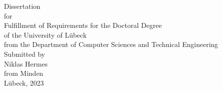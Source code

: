 \begin{center}
\begin{Large}
\end{Large}
\vspace*{2.5cm}
%
%
Dissertation\\ 
for\\
Fulfillment of Requirements for the Doctoral Degree\\
of the University of Lübeck\\[1.0cm]
%
from the Department of Computer Sciences and Technical Engineering\\[1.0cm]
%
Submitted by\\[0.1cm]
Niklas Hermes\\[0.1cm]
from Minden\\[3.0cm]
%
Lübeck, 2023
\end{center}
  



\newpage
\thispagestyle{empty}

\addtolength{\topmargin}{1.2cm} 
\addtolength{\textwidth}{-2.35cm} 
